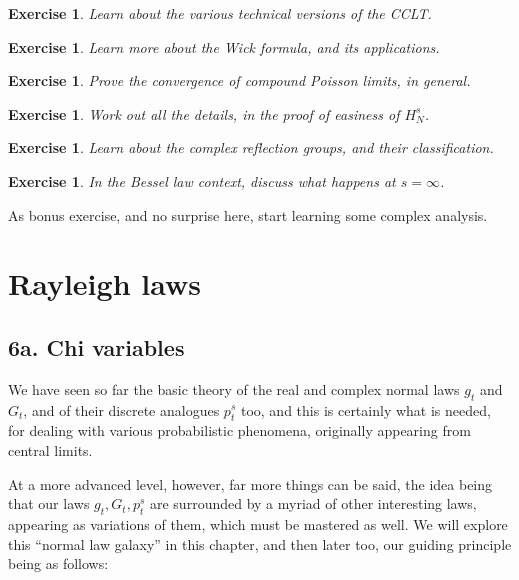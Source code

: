 \documentclass[12pt]{amsbook}
\newtheorem{exercise}[theorem]{Exercise}
\begin{document}
\begin{exercise}
Learn about the various technical versions of the CCLT.
\end{exercise}

\begin{exercise}
Learn more about the Wick formula, and its applications.
\end{exercise}

\begin{exercise}
Prove the convergence of compound Poisson limits, in general.
\end{exercise}

\begin{exercise}
Work out all the details, in the proof of easiness of $H_N^s$.
\end{exercise}

\begin{exercise}
Learn about the complex reflection groups, and their classification.
\end{exercise}

\begin{exercise}
In the Bessel law context, discuss what happens at $s=\infty$.
\end{exercise}

As bonus exercise, and no surprise here, start learning some complex analysis.

\chapter{Rayleigh laws}

\section*{6a. Chi variables}

We have seen so far the basic theory of the real and complex normal laws $g_t$ and $G_t$, and of their discrete analogues $p^s_t$ too, and this is certainly what is needed, for dealing with various probabilistic phenomena, originally appearing from central limits.

\bigskip

At a more advanced level, however, far more things can be said, the idea being that our laws $g_t,G_t,p^s_t$ are surrounded by a myriad of other interesting laws, appearing as variations of them, which must be mastered as well. We will explore this ``normal law galaxy'' in this chapter, and then later too, our guiding principle being as follows:
\end{document}
